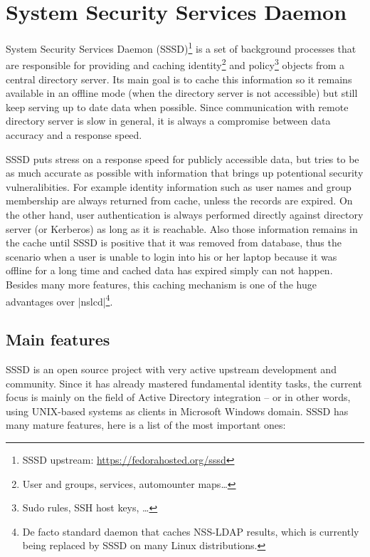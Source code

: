 \chapter{System Security Services Daemon}
\label{chapter:sssd}

System Security Services Daemon (SSSD)\footnote{SSSD upstream:
\url{https://fedorahosted.org/sssd}} is a set of background processes that
are responsible for providing and caching identity\footnote{User and groups,
services, automounter maps\ldots}
and policy\footnote{Sudo rules, SSH host keys, \ldots} objects from a central
directory server. Its main goal is to cache this information so it remains
available in an offline mode (when the directory server is not accessible) but
still keep serving up to date data when possible. Since communication with
remote directory server is slow in general, it is always a compromise between
data accuracy and a response speed.

SSSD puts stress on a response speed for publicly accessible data, but tries
to be as much accurate as possible with information that brings up potentional
security vulneralibities. For example identity information such as user names
and group membership are always returned from cache, unless the records are
expired. On the other hand, user authentication is always performed directly
against directory server (or Kerberos) as long as it is reachable. Also those
information remains in the cache until SSSD is positive that it was removed
from database, thus the scenario when a user is unable to login into his or her
laptop because it was offline for a long time and cached data has expired simply
can not happen. Besides many more features, this caching mechanism is one of
the huge advantages over |nslcd|\footnote{De facto standard daemon that caches
NSS-LDAP results, which is currently being replaced by SSSD on many Linux
distributions.}.

\section{Main features}
\label{sssd:main-features}

SSSD is an open source project with very active upstream development and
community. Since it has already mastered fundamental identity tasks, the current
focus is mainly on the field of Active Directory integration -- or in other
words, using UNIX-based systems as clients in Microsoft Windows domain. SSSD
has many mature features, here is a list of the most important ones:

